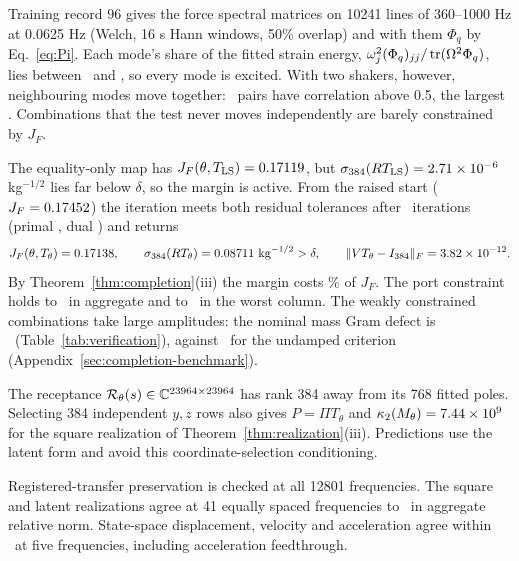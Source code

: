 Training record 96 gives the force spectral matrices on 10241 lines of
360--1000 Hz at 0.0625 Hz (Welch, 16 s Hann windows, 50\% overlap) and with
them $\Phi_q$ by Eq.~\eqref{eq:Pi}. Each mode's share of the fitted strain
energy, $\omega_j^2(\Phi_q)_{jj}/\operatorname{tr}(\Omega^2\Phi_q)$, lies between
\LabShareMin\ and \LabShareMax, so every mode is excited. With two shakers,
however, neighbouring modes move together: \LabCorrelatedPairs\ pairs have
correlation above 0.5, the largest \LabCorrelationMax. Combinations that the
test never moves independently are barely constrained by $J_F$.

The equality-only map has $J_F(\theta,T_{\rm LS})=0.17119$, but
$\sigma_{384}(RT_{\rm LS})=2.71\times10^{-6}$ kg$^{-1/2}$ lies far below
$\delta$, so the margin is active. From the raised start ($J_F=0.17452$)
the iteration meets both residual tolerances after \LabIterations\
iterations (primal \LabPrimalResidual, dual \LabDualResidual) and returns
\[
 J_F(\theta,T_\theta)=\LabJF,\qquad
 \sigma_{384}(RT_\theta)=\LabSigmaMin\ \mathrm{kg}^{-1/2}>\delta,\qquad
 \|VT_\theta-I_{384}\|_F=\LabLeftInverse.
\]
By Theorem~\ref{thm:completion}(iii) the margin costs \LabMarginCost\% of
$J_F$. The port constraint holds to \LabAnchorResidual\ in aggregate and to
\LabWorstPort\ in the worst column. The weakly constrained combinations take
large amplitudes: the nominal mass Gram defect is \LabMassDefect\
(Table~\ref{tab:verification}), against \LabMassDefectJZero\ for the
undamped criterion (Appendix~\ref{sec:completion-benchmark}).

The receptance $\mathcal R_\theta(s)\in\mathbb C^{23964\times23964}$ has rank
384 away from its 768 fitted poles. Selecting 384 independent $y,z$ rows
also gives $P=\Pi T_\theta$ and
$\kappa_2(M_\theta)=7.44\times10^{9}$ for the square realization of
Theorem~\ref{thm:realization}(iii). Predictions use the latent form and
avoid this coordinate-selection conditioning.

\begin{table}[!htbp]\centering

\caption{Fitted factors and completed map. Singular values of
$RT_\theta$ use unscaled SI translation rows (kg$^{-1/2}$). Numerical rank
uses $10^{-10}\sigma_{\max}$.}
\label{tab:primary}
\end{table}

Registered-transfer preservation is checked at all 12801 frequencies.
The square and latent realizations agree at 41 equally spaced frequencies
to \LabPhysicalResidual\ in aggregate relative norm. State-space displacement,
velocity and acceleration agree within \LabStateResidual\ at five
frequencies, including acceleration feedthrough.

